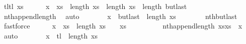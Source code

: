 \begin{isabellebody}
\ {\isacharquery}{\kern0pt}tl{\isacharequal}{\kern0pt}{\isachardoublequoteopen}tl\ {\isacharquery}{\kern0pt}xs{\isachardoublequoteclose}\isanewline
\ \ \ \ \isamarkupfalse%
\ {\isachardoublequoteopen}x\ {\isacharequal}{\kern0pt}\ {\isacharquery}{\kern0pt}xs\ {\isacharbang}{\kern0pt}\ {\isacharparenleft}{\kern0pt}length\ xs\ \ {\isachardoublequoteopen}{\isacharparenleft}{\kern0pt}length\ xs\ {\isacharless}{\kern0pt}\ length\ {\isacharquery}{\kern0pt}butlast{\isachardoublequoteclose}\isanewline
\ \ \ \ \ \ \isamarkupfalse%
\ nth{\isacharunderscore}{\kern0pt}append{\isacharunderscore}{\kern0pt}length\ \isamarkupfalse%
\ auto\isanewline
\ \ \ \ \isamarkupfalse%
\ \isamarkupfalse%
\ {\isachardoublequoteopen}x\ {\isacharequal}{\kern0pt}\ {\isacharquery}{\kern0pt}butlast\ {\isacharbang}{\kern0pt}\ {\isacharparenleft}{\kern0pt}length\ xs\isanewline
\ \ \ \ \ \ \isamarkupfalse%
\ nth{\isacharunderscore}{\kern0pt}butlast\ \isamarkupfalse%
\ fastforce\isanewline
\ \ \ \ \isamarkupfalse%
\ {\isachardoublequoteopen}x\ {\isacharequal}{\kern0pt}\ {\isacharquery}{\kern0pt}xs\ {\isacharbang}{\kern0pt}\ {\isacharparenleft}{\kern0pt}length\ xs\ {\isacharplus}{\kern0pt}\ {}{\isacharparenright}{\kern0pt}{\isachardoublequoteclose}\ \ {\isachardoublequoteopen}{\isacharquery}{\kern0pt}xs\ {\isasymnoteq}\ {\isacharbrackleft}{\kern0pt}{\isacharbrackright}{\kern0pt}{\isachardoublequoteclose}\isanewline
\ \ \ \ \ \ \isamarkupfalse%
\ nth{\isacharunderscore}{\kern0pt}append{\isacharunderscore}{\kern0pt}length{\isacharbrackleft}{\kern0pt}\ xs{\isacharequal}{\kern0pt}{\isachardoublequoteopen}xs\ {\isacharat}{\kern0pt}\ {\isacharbrackleft}{\kern0pt}x\ \isamarkupfalse%
\ auto\isanewline
\ \ \ \ \isamarkupfalse%
\ \isamarkupfalse%
\ {\isachardoublequoteopen}x\ {\isacharequal}{\kern0pt}\ {\isacharquery}{\kern0pt}tl\ {\isacharbang}{\kern0pt}\ {\isacharparenleft}{\kern0pt}length\ xs\isanewline

\end{isabellebody}
